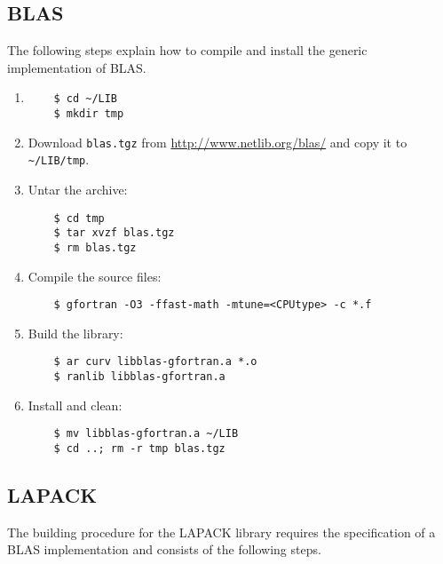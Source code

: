 \documentclass[a4paper,12pt]{article}%
\begin{document}
\subsection{BLAS}

The following steps explain how to compile and install the generic
implementation of BLAS.

\begin{enumerate}
\item
  \begin{Verbatim}
    $ cd ~/LIB
    $ mkdir tmp
  \end{Verbatim}
\item Download \verb+blas.tgz+ from \url{http://www.netlib.org/blas/}
  and copy it to \verb+~/LIB/tmp+.
\item Untar the archive:
  \begin{Verbatim}
    $ cd tmp
    $ tar xvzf blas.tgz
    $ rm blas.tgz
  \end{Verbatim}
\item Compile the source files:
  \begin{Verbatim}
    $ gfortran -O3 -ffast-math -mtune=<CPUtype> -c *.f
  \end{Verbatim}
\item Build the library:
  \begin{Verbatim}
    $ ar curv libblas-gfortran.a *.o
    $ ranlib libblas-gfortran.a
  \end{Verbatim}
\item Install and clean:
  \begin{Verbatim}
    $ mv libblas-gfortran.a ~/LIB
    $ cd ..; rm -r tmp blas.tgz
  \end{Verbatim}
\end{enumerate}

\subsection{LAPACK}

The building procedure for the LAPACK library requires the
specification of a BLAS implementation and consists of the following
steps.
\end{document}
